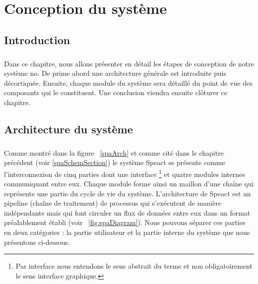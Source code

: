 \chapter{Conception du système}

\section{Introduction}
\paragraph{}
Dans ce chapitre, nous allons présenter en détail les étapes de conception de notre système no. De prime abord une architecture générale est introduite puis décortiquée. Ensuite, chaque module du système sera détaillé du point de vue des composants qui le constituent. Une conclusion viendra ensuite clôturer ce chapitre.
\section{Architecture du système}
\paragraph{}
Comme montré dans la figure ~\ref{spaArch} et comme cité dans le chapitre précédent (voir \ref{spaSchemSection}) le système Speact se présente comme l'interconnexion de cinq parties dont une interface \footnote{Par interface nous entendons le sens abstrait du terme et non obligatoirement le sens interface graphique.} et quatre modules internes communiquant entre eux. Chaque module forme ainsi un maillon d'une chaîne qui représente une partie du cycle de vie du système. L'architecture de Speact est un pipeline (chaîne de traitement) de processus qui s'exécutent de manière indépendante mais qui font circuler un flux de données entre eux dans un format préalablement établi (voir ~\ref{fig:spaDiagram}). Nous pouvons séparer ces parties en deux catégories : la partie utilisateur et la partie interne du système que nous présentons ci-dessous.

